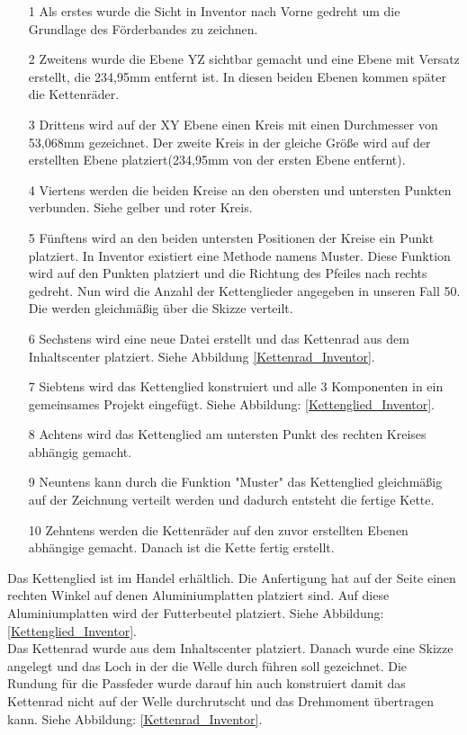 \begin{itemize}
\item[1] Als erstes wurde die Sicht in Inventor nach Vorne gedreht um die Grundlage des Förderbandes zu zeichnen.
\item[2] Zweitens wurde die Ebene YZ sichtbar gemacht und eine Ebene mit Versatz erstellt, die 234,95mm entfernt ist. In diesen beiden Ebenen kommen später die Kettenräder.
\item[3] Drittens wird auf der XY Ebene einen Kreis mit einen Durchmesser von 53,068mm gezeichnet. Der zweite Kreis in der gleiche Größe wird auf der erstellten Ebene platziert(234,95mm von der ersten Ebene entfernt). 
\item[4] Viertens werden die beiden Kreise an den obersten und untersten Punkten verbunden. Siehe gelber und roter Kreis.
\item[5] Fünftens wird an den beiden untersten Positionen der Kreise ein Punkt platziert. In Inventor existiert eine Methode namens Muster. Diese Funktion wird auf den Punkten platziert und die Richtung des Pfeiles nach rechts gedreht. Nun wird die Anzahl der Kettenglieder angegeben in unseren Fall 50. Die werden gleichmäßig über die Skizze verteilt.
\item[6] Sechstens wird eine neue Datei erstellt und das Kettenrad aus dem Inhaltscenter platziert. Siehe Abbildung \ref{Kettenrad_Inventor}.
\item[7] Siebtens wird das Kettenglied konstruiert und alle 3 Komponenten in ein gemeinsames Projekt eingefügt. Siehe Abbildung: \ref{Kettenglied_Inventor}.
\item[8] Achtens wird das Kettenglied am untersten Punkt des rechten Kreises abhängig gemacht.
\item[9] Neuntens kann durch die Funktion "Muster" das Kettenglied gleichmäßig auf der Zeichnung verteilt werden und dadurch entsteht die fertige Kette.
\item[10] Zehntens werden die Kettenräder auf den zuvor erstellten Ebenen abhängige gemacht. Danach ist die Kette fertig erstellt.\\
\end{itemize}

Das Kettenglied ist im Handel erhältlich. Die Anfertigung hat auf der Seite einen rechten Winkel auf denen Aluminiumplatten platziert sind. Auf diese Aluminiumplatten wird der Futterbeutel platziert. Siehe Abbildung: \ref{Kettenglied_Inventor}.\\

Das Kettenrad wurde aus dem Inhaltscenter platziert. Danach wurde eine Skizze angelegt und das Loch in der die Welle durch führen soll gezeichnet. Die Rundung für die Passfeder wurde darauf hin auch konstruiert damit das Kettenrad nicht auf der Welle durchrutscht und das Drehmoment übertragen kann. Siehe Abbildung: \ref{Kettenrad_Inventor}.

